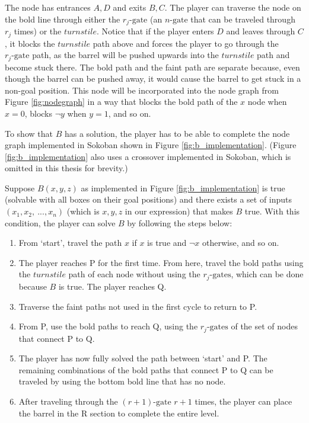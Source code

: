 The node has entrances $A,D$ and exits $B,C$. The player can traverse the node on the bold line through either the $r_j\text{-gate}$ (an $n\text{-gate}$ that can be traveled through $r_j$ times) or the $turnstile$. Notice that if the player enters $D$ and leaves through $C$, it blocks the $turnstile$ path above and forces the player to go through the $r_j\text{-gate}$ path, as the barrel will be pushed upwards into the $turnstile$ path and become stuck there. The bold path and the faint path are separate because, even though the barrel can be pushed away, it would cause the barrel to get stuck in a non-goal position. This node will be incorporated into the node graph from Figure \ref{fig:nodegraph} in a way that blocks the bold path of the $x$ node when $x=0$, blocks $\neg y$ when $y=1$, and so on.

To show that $B$ has a solution, the player has to be able to complete the node graph implemented in Sokoban shown in Figure \ref{fig:b_implementation}. (Figure \ref{fig:b_implementation} also uses a crossover implemented in Sokoban, which is omitted in this thesis for brevity.)

Suppose $B(x,y,z)$ as implemented in Figure \ref{fig:b_implementation} is true (solvable with all boxes on their goal positions) and there exists a set of inputs $(x_1,x_2,\ ... , x_n)$ (which is $x,y,z$ in our expression) that makes $B$ true. With this condition, the player can solve $B$ by following the steps below:

\begin{enumerate}
    \item From `start', travel the path $x$ if $x$ is true and $\neg x$ otherwise, and so on.
    \item The player reaches P for the first time. From here, travel the bold paths using the $turnstile$ path of each node without using the $r_j\text{-gates}$, which can be done because $B$ is true. The player reaches Q.
    \item Traverse the faint paths not used in the first cycle to return to P.
    \item From P, use the bold paths to reach Q, using the $r_j\text{-gates}$ of the set of nodes that connect P to Q.
    \item The player has now fully solved the path between `start' and P. The remaining combinations of the bold paths that connect P to Q can be traveled by using the bottom bold line that has no node.
    \item After traveling through the $(r+1)\text{-gate}$ $r+1$ times, the player can place the barrel in the R section to complete the entire level.
\end{enumerate}

